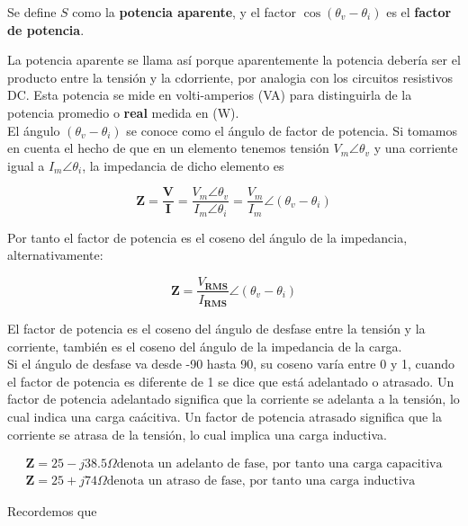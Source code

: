 Se define $S$ como la \textbf{potencia aparente}, y el factor $ \cos  (\theta_v - \theta_i)$ es el \textbf{factor de potencia}.

La potencia aparente se llama así porque aparentemente la potencia debería ser el producto entre la tensión y la cdorriente, por analogia con los circuitos resistivos DC. Esta potencia se mide en volti-amperios (VA) para distinguirla de la potencia promedio o \textbf{real} medida en (W). \\

El ángulo $ (\theta_v - \theta_i)$ se conoce como el ángulo de factor de potencia. Si tomamos en cuenta el hecho de que en un elemento tenemos tensión $V_m \angle \theta_v$ y una corriente igual a $I_m \angle \theta_i$, la impedancia de dicho elemento es

\begin{equation*}
\mathbf{Z}=\frac{\mathbf{V}}{\mathbf{I}} = \frac{V_m \angle \theta_v}{I_m \angle \theta_i} = \frac{V_m}{I_m} \angle (\theta_v - \theta_i)
\end{equation*}

Por tanto el factor de potencia es el coseno del ángulo de la impedancia, alternativamente:

\begin{equation*}
\mathbf{Z}=\frac{V_\textbf{RMS}}{I_\textbf{RMS}} \angle (\theta_v - \theta_i)
\end{equation*}

El factor de potencia es el coseno del ángulo de desfase entre la tensión y la corriente, también es el coseno del ángulo de la impedancia de la carga. \\

Si el ángulo de desfase va desde -90 hasta 90, su coseno varía entre 0 y 1, cuando el factor de potencia es diferente de 1 se dice que está adelantado o atrasado. Un factor de potencia adelantado significa que la corriente se adelanta a la tensión, lo cual indica una carga caácitiva. Un factor de potencia atrasado significa que la corriente se atrasa de la tensión, lo cual implica una carga inductiva.

\begin{eqnarray*}
\mathbf{Z} = 25-j38.5 \Omega \text{denota un adelanto de fase, por tanto una carga capacitiva} \\
\mathbf{Z} = 25+j74 \Omega \text{denota un atraso de fase, por tanto una carga inductiva}
\end{eqnarray*}

Recordemos que 

